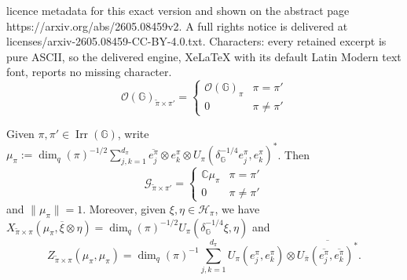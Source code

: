 \documentclass[10pt,a4paper]{amsart}
\DeclareMathOperator{\Irr}{\mathrm{Irr}}
\newcommand{\C}{\mathbb{C}}
\newcommand{\G}{\mathbb{G}}
\newcommand{\mcG}{\mathcal{G}}
\newcommand{\mcH}{\mathcal{H}}
\newcommand{\mcO}{\mathcal{O}}
\begin{document}
licence metadata for this exact version and shown on the abstract page https://arxiv.org/abs/2605.08459v2. A full rights notice is delivered at licenses/arxiv-2605.08459-CC-BY-4.0.txt. Characters: every retained excerpt is pure ASCII, so the delivered engine, XeLaTeX with its default Latin Modern text font, reports no missing character.
\begin{equation}\label{spectralsubspaces}
    \mcO(\G)_{\tilde{\pi}\times \pi'}= \begin{cases}
        \mcO(\G)_\pi & \pi = \pi'\\
        0 & \pi\ne \pi'
    \end{cases}
\end{equation}

\begin{Prop}\label{spectraldata}
    Given $\pi, \pi'\in \Irr(\G)$, write $\mu_\pi:= \dim_q(\pi)^{-1/2}\sum_{j,k=1}^{d_\pi} \overline{e_j^\pi}\otimes e_k^\pi\otimes U_\pi(\delta_\G^{-1/4}e_j^\pi, e_k^\pi)^*$. Then
    $$\mcG_{\tilde{\pi}\times \pi'}= \begin{cases}
        \C \mu_\pi & \pi = \pi'\\
        0 & \pi\ne \pi'
    \end{cases}$$
    and $\|\mu_\pi\|=1$. Moreover, given $\xi, \eta \in \mcH_{\pi}$, we have $X_{\tilde{\pi}\times \pi}(\mu_\pi, \overline{\xi}\otimes \eta)= \dim_q(\pi)^{-1/2} U_\pi(\delta_\G^{-1/4}\xi, \eta)$ and $$Z_{\tilde{\pi}\times \pi}(\mu_\pi, \mu_\pi)= \dim_q(\pi)^{-1} \sum_{j,k=1}^{d_\pi} U_\pi(e_j^\pi, e_k^\pi)\otimes \overline{U_{\bar{\pi}}(\overline{e_j^\pi}, \overline{e_k^\pi})^*}.$$
    \end{Prop}
\end{document}
